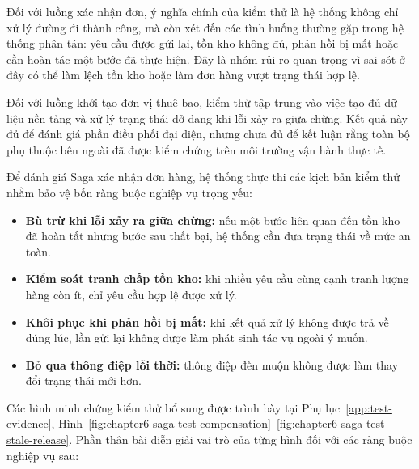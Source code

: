 Đối với luồng xác nhận đơn, ý nghĩa chính của kiểm thử là hệ thống không chỉ xử lý đường đi thành công, mà còn xét đến các tình huống thường gặp trong hệ thống phân tán: yêu cầu được gửi lại, tồn kho không đủ, phản hồi bị mất hoặc cần hoàn tác một bước đã thực hiện. Đây là nhóm rủi ro quan trọng vì sai sót ở đây có thể làm lệch tồn kho hoặc làm đơn hàng vượt trạng thái hợp lệ.

Đối với luồng khởi tạo đơn vị thuê bao, kiểm thử tập trung vào việc tạo đủ dữ liệu nền tảng và xử lý trạng thái dở dang khi lỗi xảy ra giữa chừng. Kết quả này đủ để đánh giá phần điều phối đại diện, nhưng chưa đủ để kết luận rằng toàn bộ phụ thuộc bên ngoài đã được kiểm chứng trên môi trường vận hành thực tế.

Để đánh giá Saga xác nhận đơn hàng, hệ thống thực thi các kịch bản kiểm thử nhằm bảo vệ bốn ràng buộc nghiệp vụ trọng yếu:
\begin{itemize}
  \item \textbf{Bù trừ khi lỗi xảy ra giữa chừng:} nếu một bước liên quan đến tồn kho đã hoàn tất nhưng bước sau thất bại, hệ thống cần đưa trạng thái về mức an toàn.
  \item \textbf{Kiểm soát tranh chấp tồn kho:} khi nhiều yêu cầu cùng cạnh tranh lượng hàng còn ít, chỉ yêu cầu hợp lệ được xử lý.
  \item \textbf{Khôi phục khi phản hồi bị mất:} khi kết quả xử lý không được trả về đúng lúc, lần gửi lại không được làm phát sinh tác vụ ngoài ý muốn.
  \item \textbf{Bỏ qua thông điệp lỗi thời:} thông điệp đến muộn không được làm thay đổi trạng thái mới hơn.
\end{itemize}

Các hình minh chứng kiểm thử bổ sung được trình bày tại Phụ lục~\ref{app:test-evidence}, Hình~\ref{fig:chapter6-saga-test-compensation}--\ref{fig:chapter6-saga-test-stale-release}. Phần thân bài diễn giải vai trò của từng hình đối với các ràng buộc nghiệp vụ sau:

